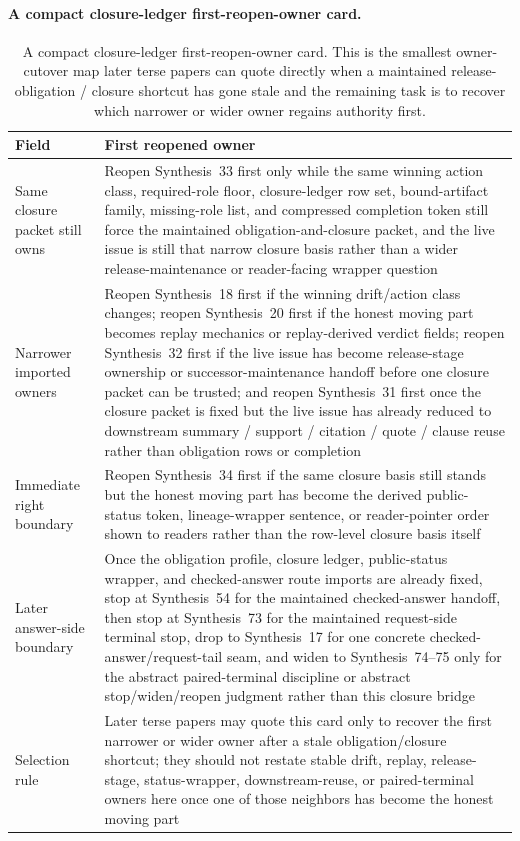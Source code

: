 \documentclass[11pt]{article}
\begin{document}
\paragraph{A compact closure-ledger first-reopen-owner card.}
\begin{table}[t]
\centering
\small
\begin{tabularx}{\linewidth}{@{}lX@{}}
\toprule
Field & First reopened owner \\
\midrule
Same closure packet still owns & Reopen Synthesis~33 first only while the same winning action class, required-role floor, closure-ledger row set, bound-artifact family, missing-role list, and compressed completion token still force the maintained obligation-and-closure packet, and the live issue is still that narrow closure basis rather than a wider release-maintenance or reader-facing wrapper question \\
Narrower imported owners & Reopen Synthesis~18 first if the winning drift/action class changes; reopen Synthesis~20 first if the honest moving part becomes replay mechanics or replay-derived verdict fields; reopen Synthesis~32 first if the live issue has become release-stage ownership or successor-maintenance handoff before one closure packet can be trusted; and reopen Synthesis~31 first once the closure packet is fixed but the live issue has already reduced to downstream summary / support / citation / quote / clause reuse rather than obligation rows or completion \\
Immediate right boundary & Reopen Synthesis~34 first if the same closure basis still stands but the honest moving part has become the derived public-status token, lineage-wrapper sentence, or reader-pointer order shown to readers rather than the row-level closure basis itself \\
Later answer-side boundary & Once the obligation profile, closure ledger, public-status wrapper, and checked-answer route imports are already fixed, stop at Synthesis~54 for the maintained checked-answer handoff, then stop at Synthesis~73 for the maintained request-side terminal stop, drop to Synthesis~17 for one concrete checked-answer/request-tail seam, and widen to Synthesis~74--75 only for the abstract paired-terminal discipline or abstract stop/widen/reopen judgment rather than this closure bridge \\
Selection rule & Later terse papers may quote this card only to recover the first narrower or wider owner after a stale obligation/closure shortcut; they should not restate stable drift, replay, release-stage, status-wrapper, downstream-reuse, or paired-terminal owners here once one of those neighbors has become the honest moving part \\
\bottomrule
\end{tabularx}
\caption{A compact closure-ledger first-reopen-owner card. This is the smallest owner-cutover map later terse papers can quote directly when a maintained release-obligation / closure shortcut has gone stale and the remaining task is to recover which narrower or wider owner regains authority first.}
\label{tab:closure-ledger-first-reopen-owner-card}
\end{table}
\end{document}
